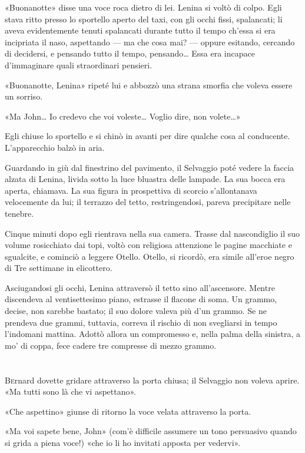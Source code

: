 \documentclass[
a5paper, %
10pt, %
twoside, 
onecolumn, %
openany, %
]{memoir}
\begin{document}
«Buonanotte» disse una voce roca dietro di lei. Lenina si voltò di colpo. Egli stava ritto presso lo sportello aperto del taxi, con gli occhi fissi, spalancati; li aveva evidentemente tenuti spalancati durante tutto il tempo ch’essa si era incipriata il naso, aspettando — ma che cosa mai? — oppure esitando, cercando di decidersi, e pensando tutto il tempo, pensando… Essa era incapace d’immaginare quali straordinari pensieri.

«Buonanotte, Lenina» ripeté lui e abbozzò una strana smorfia che voleva essere un sorriso.

«Ma John… Io credevo che voi voleste… Voglio dire, non volete…»

Egli chiuse lo sportello e si chinò in avanti per dire qualche cosa al conducente. L’apparecchio balzò in aria.

Guardando in giù dal finestrino del pavimento, il Selvaggio poté vedere la faccia alzata di Lenina, livida sotto la luce bluastra delle lampade. La sua bocca era aperta, chiamava. La sua figura in prospettiva di scorcio s’allontanava velocemente da lui; il terrazzo del tetto, restringendosi, pareva precipitare nelle tenebre.

Cinque minuti dopo egli rientrava nella sua camera. Trasse dal nascondiglio il suo volume rosicchiato dai topi, voltò con religiosa attenzione le pagine macchiate e sgualcite, e cominciò a leggere Otello. Otello, si ricordò, era simile all’eroe negro di Tre settimane in elicottero.

Asciugandosi gli occhi, Lenina attraversò il tetto sino all’ascensore. Mentre discendeva al ventisettesimo piano, estrasse il flacone di soma. Un grammo, decise, non sarebbe bastato; il suo dolore valeva più d’un grammo. Se ne prendeva due grammi, tuttavia, correva il rischio di non svegliarsi in tempo l’indomani mattina. Adottò allora un compromesso e, nella palma della sinistra, a mo’ di coppa, fece cadere tre compresse di mezzo grammo.

\chapter{\phantom{title}}

\lettrine{B}ernard dovette gridare attraverso la porta chiusa; il Selvaggio non voleva aprire. «Ma tutti sono là che vi aspettano».

«Che aspettino» giunse di ritorno la voce velata attraverso la porta.

«Ma voi sapete bene, John» (com’è difficile assumere un tono persuasivo quando si grida a piena voce!) «che io li ho invitati apposta per vedervi».
\end{document}
